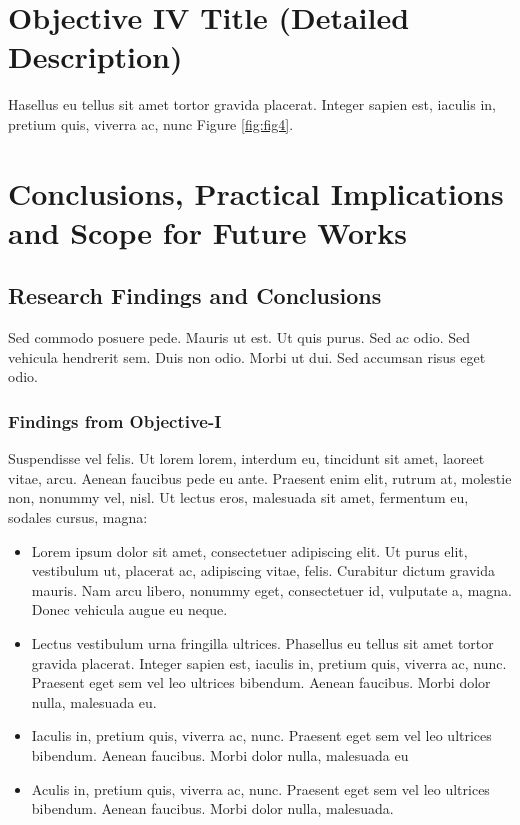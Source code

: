 \documentclass{article}
\begin{document}



\section{Objective IV Title (Detailed Description)}
Hasellus eu tellus sit amet tortor gravida placerat. Integer sapien est, iaculis in, pretium quis, viverra ac, nunc Figure \ref{fig:fig4}.
\lipsum[1-2]

\lipsum[3-6]



\lipsum[5-7]
     
     
\section{Conclusions, Practical Implications and Scope for Future Works}

\subsection{Research Findings and Conclusions}
Sed commodo posuere pede. Mauris ut est. Ut quis purus. Sed ac odio. Sed vehicula hendrerit sem. Duis non odio. Morbi ut dui. Sed accumsan risus eget odio.

\subsubsection{Findings from Objective-I}
Suspendisse vel felis. Ut lorem lorem, interdum eu, tincidunt sit amet, laoreet vitae, arcu. Aenean faucibus pede eu ante. Praesent enim elit, rutrum at, molestie non, nonummy vel, nisl. Ut lectus eros, malesuada sit amet, fermentum eu, sodales cursus, magna:

\begin{itemize}
\item Lorem ipsum dolor sit amet, consectetuer adipiscing elit. Ut purus elit, vestibulum ut, placerat ac,
adipiscing vitae, felis. Curabitur dictum gravida mauris. Nam arcu libero, nonummy eget, consectetuer id, vulputate a, magna. Donec vehicula augue eu neque.

\item Lectus vestibulum urna fringilla ultrices. Phasellus eu tellus sit amet tortor gravida placerat. Integer
sapien est, iaculis in, pretium quis, viverra ac, nunc. Praesent eget sem vel leo ultrices bibendum.
Aenean faucibus. Morbi dolor nulla, malesuada eu.

\item Iaculis in, pretium quis, viverra ac, nunc. Praesent eget sem vel leo ultrices bibendum. Aenean faucibus. Morbi dolor nulla, malesuada eu

\item Aculis in, pretium quis, viverra ac, nunc. Praesent eget sem vel leo ultrices bibendum. Aenean faucibus. Morbi dolor nulla, malesuada.

\end{itemize}
\end{document}
